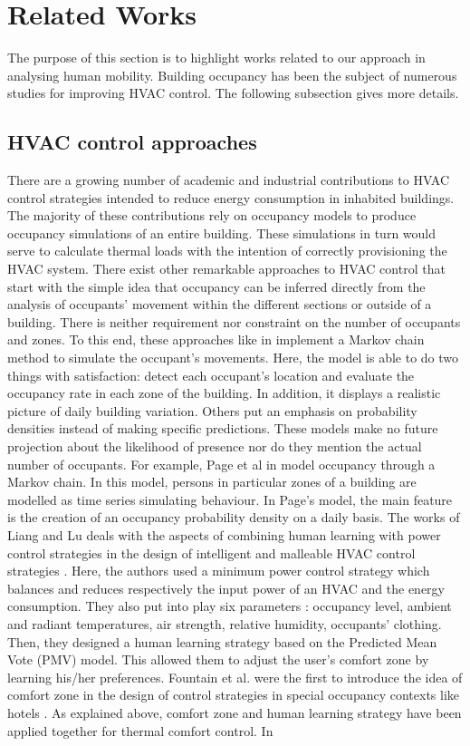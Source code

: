 \section{Related Works}
\label{sec:relatedworks}

The purpose of this section is to highlight works related to our approach in analysing human mobility. Building occupancy has been the subject of numerous studies for improving HVAC control. The following subsection gives more details.

\subsection{ HVAC control approaches}
There are a growing number of academic and industrial contributions to HVAC control strategies intended to reduce energy consumption in inhabited buildings. The majority of these contributions rely on occupancy models to produce occupancy simulations of an entire building. These simulations in turn would serve to calculate thermal loads with the intention of correctly provisioning the  HVAC system. There exist other remarkable approaches to HVAC control that start with the simple idea that occupancy can be inferred directly from the analysis of occupants’ movement within the different sections or outside of a building. There is neither requirement nor constraint on the number of occupants and zones. To this end, these approaches like in \cite{buildingoccupancyusingmarkov} implement a Markov chain method to simulate the occupant’s movements. Here, the model is able to do two things with satisfaction: detect each occupant’s location and evaluate the occupancy rate in each zone of the building. In addition, it displays a realistic picture of daily building variation. Others put an emphasis on probability densities instead of making specific predictions. These models make no future projection about the likelihood of presence nor do they mention the actual number of occupants. For example, Page et al in \cite{stochasticsimulation}  model occupancy through a Markov chain. In this model, persons in particular zones of a building are modelled as time series simulating behaviour. In Page’s model, the main feature is the creation of an occupancy probability density on a daily basis.   The works of Liang and Lu deals with the aspects of combining human learning with power control strategies in the design of intelligent and malleable HVAC control strategies \cite{Designofintelligentcomfort}. Here, the authors used a minimum power control strategy which balances and reduces respectively the input power of an HVAC and the energy consumption. They also put into play six parameters : occupancy level, ambient and radiant temperatures, air strength, relative humidity, occupants’ clothing. Then, they designed a human learning strategy based on the Predicted Mean Vote (PMV) model. This allowed them to adjust the user’s comfort zone by learning his/her preferences. Fountain et al. were the first to introduce the idea of comfort zone in the design of control strategies in special occupancy contexts like hotels \cite{Comfortcontrol}. As explained above, comfort zone and human learning strategy have been applied together for thermal comfort control. In 
